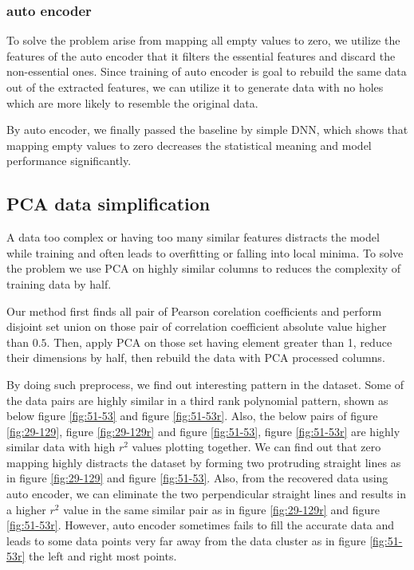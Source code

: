 \documentclass[12pt,a4paper]{article}
\begin{document}
\subsubsection{auto encoder}
To solve the problem arise from mapping all empty values to zero, we utilize the features of the auto encoder that it filters the essential features and discard the non-essential ones.
Since training of auto encoder is goal to rebuild the same data out of the extracted features, we can utilize it to generate data with no holes which are more likely to resemble the original data.

By auto encoder, we finally passed the baseline by simple DNN, which shows that mapping empty values to zero decreases the statistical meaning and model performance significantly.


\subsection{PCA data simplification}
A data too complex or having too many similar features distracts the model while training and often leads to overfitting or falling into local minima. To solve the problem we use PCA on highly similar columns to reduces the complexity of training data by half.

Our method first finds all pair of Pearson corelation coefficients and perform disjoint set union on those pair of correlation coefficient absolute value higher than $0.5$. Then, apply PCA on those set having element greater than 1, reduce their dimensions by half, then rebuild the data with PCA processed columns.

By doing such preprocess, we find out interesting pattern in the dataset.
Some of the data pairs are highly similar in a third rank polynomial pattern, shown as below figure \ref{fig:51-53} and figure \ref{fig:51-53r}.
Also, the below pairs of figure \ref{fig:29-129}, figure \ref{fig:29-129r} and figure \ref{fig:51-53}, figure \ref{fig:51-53r} are highly similar data with high $r^2$ values plotting together.
We can find out that zero mapping highly distracts the dataset by forming two protruding straight lines as in figure \ref{fig:29-129} and figure \ref{fig:51-53}.
Also, from the recovered data using auto encoder, we can eliminate the two perpendicular straight lines and results in a higher $r^2$ value in the same similar pair as in figure \ref{fig:29-129r} and figure \ref{fig:51-53r}.
However, auto encoder sometimes fails to fill the accurate data and leads to some data points very far away from the data cluster as in figure \ref{fig:51-53r} the left and right most points.
\end{document}
